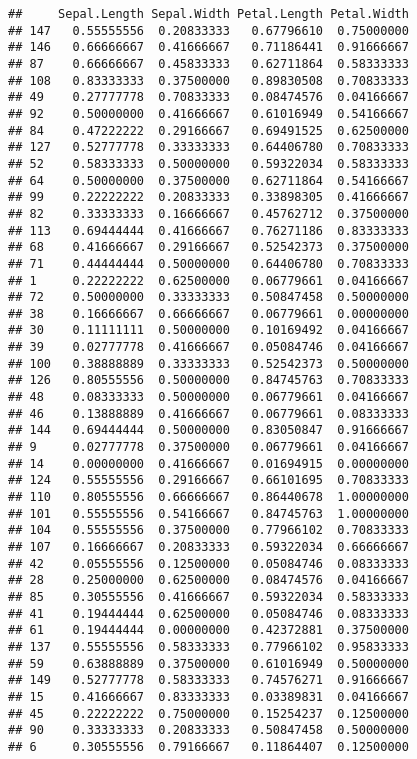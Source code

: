\documentclass[
]{article}
\begin{document}
\begin{verbatim}
##     Sepal.Length Sepal.Width Petal.Length Petal.Width
## 147   0.55555556  0.20833333   0.67796610  0.75000000
## 146   0.66666667  0.41666667   0.71186441  0.91666667
## 87    0.66666667  0.45833333   0.62711864  0.58333333
## 108   0.83333333  0.37500000   0.89830508  0.70833333
## 49    0.27777778  0.70833333   0.08474576  0.04166667
## 92    0.50000000  0.41666667   0.61016949  0.54166667
## 84    0.47222222  0.29166667   0.69491525  0.62500000
## 127   0.52777778  0.33333333   0.64406780  0.70833333
## 52    0.58333333  0.50000000   0.59322034  0.58333333
## 64    0.50000000  0.37500000   0.62711864  0.54166667
## 99    0.22222222  0.20833333   0.33898305  0.41666667
## 82    0.33333333  0.16666667   0.45762712  0.37500000
## 113   0.69444444  0.41666667   0.76271186  0.83333333
## 68    0.41666667  0.29166667   0.52542373  0.37500000
## 71    0.44444444  0.50000000   0.64406780  0.70833333
## 1     0.22222222  0.62500000   0.06779661  0.04166667
## 72    0.50000000  0.33333333   0.50847458  0.50000000
## 38    0.16666667  0.66666667   0.06779661  0.00000000
## 30    0.11111111  0.50000000   0.10169492  0.04166667
## 39    0.02777778  0.41666667   0.05084746  0.04166667
## 100   0.38888889  0.33333333   0.52542373  0.50000000
## 126   0.80555556  0.50000000   0.84745763  0.70833333
## 48    0.08333333  0.50000000   0.06779661  0.04166667
## 46    0.13888889  0.41666667   0.06779661  0.08333333
## 144   0.69444444  0.50000000   0.83050847  0.91666667
## 9     0.02777778  0.37500000   0.06779661  0.04166667
## 14    0.00000000  0.41666667   0.01694915  0.00000000
## 124   0.55555556  0.29166667   0.66101695  0.70833333
## 110   0.80555556  0.66666667   0.86440678  1.00000000
## 101   0.55555556  0.54166667   0.84745763  1.00000000
## 104   0.55555556  0.37500000   0.77966102  0.70833333
## 107   0.16666667  0.20833333   0.59322034  0.66666667
## 42    0.05555556  0.12500000   0.05084746  0.08333333
## 28    0.25000000  0.62500000   0.08474576  0.04166667
## 85    0.30555556  0.41666667   0.59322034  0.58333333
## 41    0.19444444  0.62500000   0.05084746  0.08333333
## 61    0.19444444  0.00000000   0.42372881  0.37500000
## 137   0.55555556  0.58333333   0.77966102  0.95833333
## 59    0.63888889  0.37500000   0.61016949  0.50000000
## 149   0.52777778  0.58333333   0.74576271  0.91666667
## 15    0.41666667  0.83333333   0.03389831  0.04166667
## 45    0.22222222  0.75000000   0.15254237  0.12500000
## 90    0.33333333  0.20833333   0.50847458  0.50000000
## 6     0.30555556  0.79166667   0.11864407  0.12500000

\end{verbatim}
\end{document}
